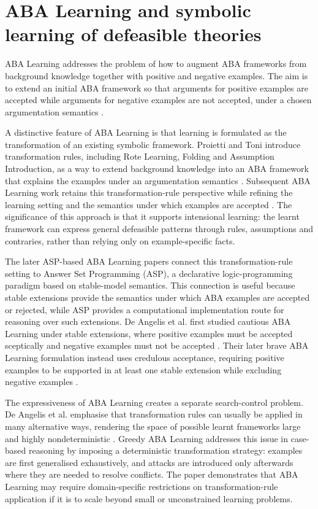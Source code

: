 \section{ABA Learning and symbolic learning of defeasible theories}
ABA Learning addresses the problem of how to augment ABA frameworks from background knowledge together with positive and negative examples. The aim is to extend an initial ABA framework so that arguments for positive examples are accepted while arguments for negative examples are not accepted, under a chosen argumentation semantics \cite{proietti2022learning,de2023aba}.

A distinctive feature of ABA Learning is that learning is formulated as the transformation of an existing symbolic framework. Proietti and Toni introduce transformation rules, including Rote Learning, Folding and Assumption Introduction, as a way to extend background knowledge into an ABA framework that explains the examples under an argumentation semantics \cite{proietti2022learning}. Subsequent ABA Learning work retains this transformation-rule perspective while refining the learning setting and the semantics under which examples are accepted \cite{de2023aba, de2024learning}. The significance of this approach is that it supports intensional learning: the learnt framework can express general defeasible patterns through rules, assumptions and contraries, rather than relying only on example-specific facts.

The later ASP-based ABA Learning papers connect this transformation-rule setting to Answer Set Programming (ASP), a declarative logic-programming paradigm based on stable-model semantics. This connection is useful because stable extensions provide the semantics under which ABA examples are accepted or rejected, while ASP provides a computational implementation route for reasoning over such extensions. De Angelis et al. first studied cautious ABA Learning under stable extensions, where positive examples must be accepted sceptically and negative examples must not be accepted \cite{de2023aba}. Their later brave ABA Learning formulation instead uses credulous acceptance, requiring positive examples to be supported in at least one stable extension while excluding negative examples \cite{de2024learning}.

The expressiveness of ABA Learning creates a separate search-control problem. De Angelis et al. emphasise that transformation rules can usually be applied in many alternative ways, rendering the space of possible learnt frameworks large and highly nondeterministic \cite{de2025greedy}. Greedy ABA Learning addresses this issue in case-based reasoning by imposing a deterministic transformation strategy: examples are first generalised exhaustively, and attacks are introduced only afterwards where they are needed to resolve conflicts. The paper demonstrates that ABA Learning may require domain-specific restrictions on transformation-rule application if it is to scale beyond small or unconstrained learning problems.

